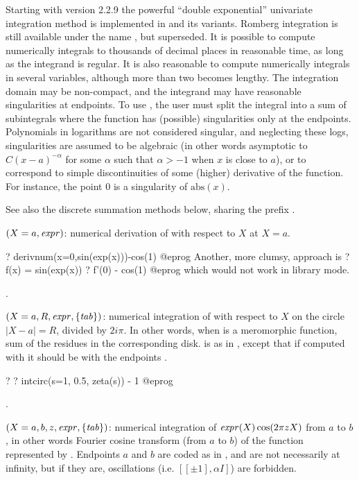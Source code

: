 Starting with version 2.2.9 the powerful ``double exponential'' univariate
integration method is implemented in  and its variants. Romberg
integration is still available under the name , but
superseded. It is possible to compute numerically integrals to thousands of
decimal places in reasonable time, as long as the integrand is regular. It is
also reasonable to compute numerically integrals in several variables,
although more than two becomes lengthy. The integration domain may be
non-compact, and the integrand may have reasonable singularities at
endpoints. To use , the user must split the integral into a sum
of subintegrals where the function has (possible) singularities only at the
endpoints. Polynomials in logarithms are not considered singular, and
neglecting these logs, singularities are assumed to be algebraic (in other
words asymptotic to $C(x-a)^{-\alpha}$ for some $\alpha$ such that
$\alpha>-1$ when $x$ is close to $a$), or to correspond to simple
discontinuities of some (higher) derivative of the function. For instance,
the point $0$ is a singularity of $\text{abs}(x)$.

See also the discrete summation methods below, sharing the prefix .

$(X=a,\hbox{\it expr\/})$: numerical derivation of  with
respect to $X$ at $X=a$.

\bprog
? derivnum(x=0,sin(exp(x)))-cos(1)
@eprog
Another, more clumsy, approach is
\bprog
? f(x) = sin(exp(x))
? f'(0) - cos(1)
@eprog\noindent
which would not work in library mode.

.

$(X=a,R,\hbox{\it expr\/}, \{\hbox{\it tab\/}\})$: numerical
integration of  with respect to $X$ on the circle $|X-a|=R$,
divided by $2i\pi$. In other words, when  is a meromorphic
function, sum of the residues in the corresponding disk.  is as in
, except that if computed with  it should be with
the endpoints \kbd{[-1, 1]}.

\bprog
? 
? intcirc(s=1, 0.5, zeta(s)) - 1
@eprog

.

$(X=a,b,z,\hbox{\it expr\/},\{\hbox{\it tab\/}\})$: numerical
integration of $\hbox{\it expr\/}(X)\cos(2\pi zX)$ from $a$ to $b$, in other words
Fourier cosine transform (from $a$ to $b$) of the function represented by
. Endpoints $a$ and $b$ are coded as in , and are not
necessarily at infinity, but if they are, oscillations (i.e. $[[\pm1],\alpha
I]$) are forbidden.

